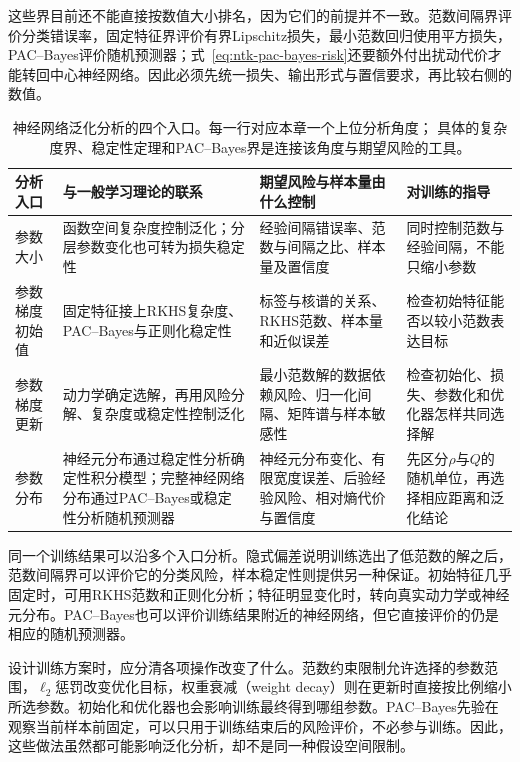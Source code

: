 这些界目前还不能直接按数值大小排名，因为它们的前提并不一致。范数间隔界评价分类错误率，固定特征界评价有界Lipschitz损失，最小范数回归使用平方损失，PAC--Bayes评价随机预测器；式~\eqref{eq:ntk-pac-bayes-risk}还要额外付出扰动代价才能转回中心神经网络。因此必须先统一损失、输出形式与置信要求，再比较右侧的数值。

\begin{table}[!htb]
 \centering
 \small
 \begin{tabular}{p{24mm}p{43mm}p{46mm}p{38mm}}
 \toprule
 分析入口 & 与一般学习理论的联系 & 期望风险与样本量由什么控制 & 对训练的指导\\
 \midrule
 参数大小 & 函数空间复杂度控制泛化；分层参数变化也可转为损失稳定性 & 经验间隔错误率、范数与间隔之比、样本量及置信度 & 同时控制范数与经验间隔，不能只缩小参数\\
 参数梯度初始值 & 固定特征接上RKHS复杂度、PAC--Bayes与正则化稳定性 & 标签与核谱的关系、RKHS范数、样本量和近似误差 & 检查初始特征能否以较小范数表达目标\\
 参数梯度更新 & 动力学确定选解，再用风险分解、复杂度或稳定性控制泛化 & 最小范数解的数据依赖风险、归一化间隔、矩阵谱与样本敏感性 & 检查初始化、损失、参数化和优化器怎样共同选择解\\
 参数分布 & 神经元分布通过稳定性分析确定性积分模型；完整神经网络分布通过PAC--Bayes或稳定性分析随机预测器 & 神经元分布变化、有限宽度误差、后验经验风险、相对熵代价与置信度 & 先区分$\rho$与$Q$的随机单位，再选择相应距离和泛化结论\\
 \bottomrule
 \end{tabular}
 \caption{神经网络泛化分析的四个入口。每一行对应本章一个上位分析角度；
 具体的复杂度界、稳定性定理和PAC--Bayes界是连接该角度与期望风险的工具。}
 \label{tab:deep-generalization-routes}
\end{table}

同一个训练结果可以沿多个入口分析。隐式偏差说明训练选出了低范数的解之后，范数间隔界可以评价它的分类风险，样本稳定性则提供另一种保证。初始特征几乎固定时，可用RKHS范数和正则化分析；特征明显变化时，转向真实动力学或神经元分布。PAC--Bayes也可以评价训练结果附近的神经网络，但它直接评价的仍是相应的随机预测器。

设计训练方案时，应分清各项操作改变了什么。范数约束限制允许选择的参数范围，$\ell_2$惩罚改变优化目标，权重衰减（weight decay）则在更新时直接按比例缩小所选参数。初始化和优化器也会影响训练最终得到哪组参数。PAC--Bayes先验在观察当前样本前固定，可以只用于训练结束后的风险评价，不必参与训练。因此，这些做法虽然都可能影响泛化分析，却不是同一种假设空间限制。

